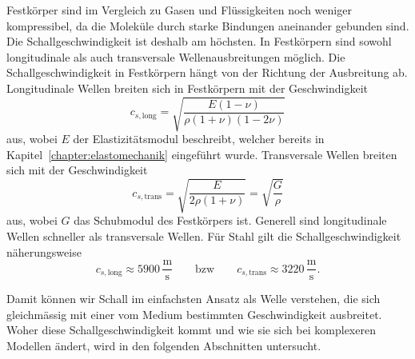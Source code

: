 Festkörper sind im Vergleich zu Gasen und Flüssigkeiten noch weniger
kompressibel, da die Moleküle durch starke Bindungen aneinander gebunden sind.
Die Schallgeschwindigkeit ist deshalb am höchsten.
In Festkörpern sind sowohl longitudinale als auch transversale
Wellenausbreitungen möglich.
Die Schallgeschwindigkeit in Festkörpern hängt von der Richtung der
Ausbreitung ab.
Longitudinale Wellen breiten sich in Festkörpern mit der Geschwindigkeit
\begin{equation*}
    c_{s,\text{long}} = \!\sqrt{\frac{E(1-\nu)}{\rho(1+\nu)(1-2\nu)}}
\end{equation*}
aus, wobei $E$ der Elastizitätsmodul beschreibt, welcher bereits in
%
Kapitel~\ref{chapter:elastomechanik} eingeführt wurde.
Transversale Wellen breiten sich mit der Geschwindigkeit
%
\begin{equation*}
    c_{s,\text{trans}} = \!\sqrt{\frac{E}{2\rho(1+\nu)}} = \!\sqrt{\frac{G}{\rho}}
\end{equation*}
aus, wobei $G$ das Schubmodul des Festkörpers ist.
%
%
Generell sind longitudinale Wellen schneller als transversale Wellen.
%
Für Stahl gilt die Schallgeschwindigkeit näherungsweise
\begin{equation*}
    c_{s,\text{long}} \approx 5900 \,\frac{\mathrm{m}}{\mathrm{s}}
\qquad\text{bzw}\qquad
    c_{s,\text{trans}} \approx 3220 \,\frac{\mathrm{m}}{\mathrm{s}}.
\end{equation*}

Damit können wir Schall im einfachsten Ansatz als Welle verstehen, die
sich gleichmässig mit einer vom Medium bestimmten Geschwindigkeit ausbreitet.
Woher diese Schallgeschwindigkeit kommt und wie sie sich bei
komplexeren Modellen ändert, wird in den folgenden Abschnitten untersucht.
